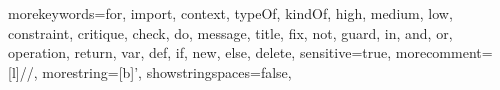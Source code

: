 {morekeywords={for, import, context, typeOf, kindOf, high, medium, low, constraint, critique, check, do, message, title, fix, not, guard, in, and, or, operation, return, var, def, if, new, else, delete},
sensitive=true,
morecomment=[l]{//},
morestring=[b]',
showstringspaces=false,
}